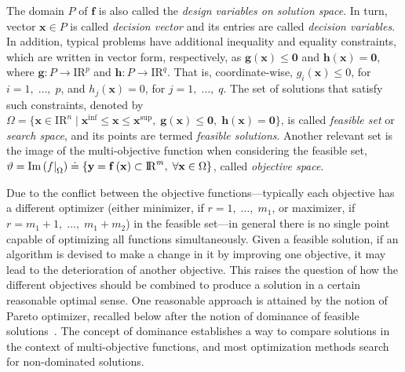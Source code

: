 \documentclass[final,5p,times,twocolumn,numbers]{elsarticle}
\newcommand\restr[2]{{\left.\kern-\nulldelimiterspace#1\right|_{#2}}}
\begin{document}
The domain $ P $ of $ \mathbf{f} $ is also called the \textit{design variables on solution space}. In turn, vector $ \mathbf{x} \in P $ is called \textit{decision vector} and its entries are called \textit{decision variables}. In addition, typical problems have additional inequality and equality constraints, which are written in vector form, respectively, as $ \mathbf{g} \left( \mathbf{x} \right) \leq \mathbf{0} $ and $ \mathbf{h} \left( \mathbf{x} \right) = \mathbf{0} $, where $ \mathbf{g} : P \rightarrow \mathrm{I\!R}^{p} $ and $ \mathbf{h} : P \rightarrow \mathrm{I\!R}^{q} $. That is, coordinate-wise, $ g_{i} \left( \mathbf{x} \right) \leq 0 $, for $ i = 1, \; \dots, \; p $, and $ h_{j} \left( \mathbf{x} \right) = 0 $, for $ j = 1, \; \dots, \; q $. The set of solutions that satisfy such constraints, denoted by $ \Omega = \lbrace \mathbf{x} \in \mathrm{I\!R}^{n} \; \vert \; \mathbf{x}^{\mathrm{inf}} \leq \mathbf{x} \leq \mathbf{x}^{\mathrm{sup}}, \; \mathbf{g} \left( \mathbf{x} \right) \leq \mathbf{0}, \; \mathbf{h} \left( \mathbf{x} \right) = \mathbf{0} \rbrace $, is called \textit{feasible set} or \textit{search space}, and its points are termed \textit{feasible solutions}. Another relevant set is the image of the multi-objective function when considering the feasible set, $ \vartheta = \mathrm{Im} \left( \restr{f}{\Omega} \right) \doteq \lbrace \mathbf{y} = \mathbf{f} \left( \mathbf{x} \right) \subset \mathrm{I\!R}^{m}, \; \forall \mathbf{x} \in \Omega \rbrace $, called \textit{objective space}.

Due to the conflict between the objective functions---typically each objective has a different optimizer (either minimizer, if $ r = 1, \; \dots, \; m_{1} $, or maximizer, if $ r = m_{1} + 1, \; \dots, \; m_{1} + m_{2} $) in the feasible set---in general there is no single point capable of optimizing all functions simultaneously. Given a feasible solution, if an algorithm is devised to make a change in it by improving one objective, it may lead to the deterioration of another objective. This raises the question of how the different objectives should be combined to produce a solution in a certain reasonable optimal sense. One reasonable approach is attained by the notion of Pareto optimizer, recalled below after the notion of dominance of feasible solutions~\cite{bib:deb2001}. The concept of dominance establishes a way to compare solutions in the context of multi-objective functions, and most optimization methods search for non-dominated solutions.
\end{document}

